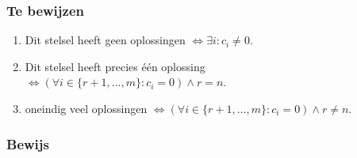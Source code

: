 \documentclass[lineaire_algebra_oplossingen.tex]{subfiles}
\begin{document}
\subsubsection*{Te bewijzen}
\begin{enumerate}
\item Dit stelsel heeft geen oplossingen $\Leftrightarrow \exists i: c_i \neq 0$.
\item Dit stelsel heeft precies één oplossing $\Leftrightarrow (\forall i \in \{r+1,...,m\}: c_i=0) \wedge r=n$. 
\item oneindig veel oplossingen $\Leftrightarrow (\forall i \in \{r+1,...,m\}: c_i=0) \wedge r\neq n$.
\end{enumerate}

\subsubsection*{Bewijs}
\end{document}
